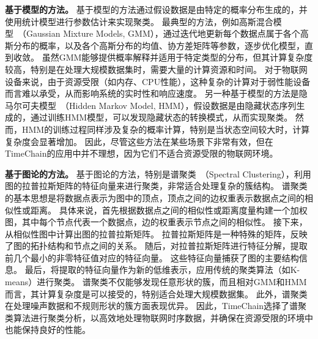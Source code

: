 \textbf{基于模型的方法。}
基于模型的方法通过假设数据是由特定的概率分布生成的，并使用统计模型进行参数估计来实现聚类。
最典型的方法，例如高斯混合模型~\cite{kanungo2002efficient}（Gaussian Mixture Models, GMM），通过迭代地更新每个数据点属于各个高斯分布的概率，以及各个高斯分布的均值、协方差矩阵等参数，逐步优化模型，直到收敛。
虽然GMM能够提供概率解释并适用于特定类型的分布，但其计算复杂度较高，特别是在处理大规模数据集时，需要大量的计算资源和时间。
对于物联网设备来说，由于资源受限（如内存、CPU性能），这种复杂的计算对于弱性能设备而言难以承受，从而影响系统的实时性和响应速度。
另一种基于模型的方法是隐马尔可夫模型~\cite{he2010laplacian}（Hidden Markov Model, HMM），假设数据是由隐藏状态序列生成的，通过训练HMM模型，可以发现隐藏状态的转换模式，从而实现聚类。
然而，HMM的训练过程同样涉及复杂的概率计算，特别是当状态空间较大时，计算复杂度会显著增加。
因此，尽管这些方法在某些场景下非常有效，但在TimeChain的应用中并不理想，因为它们不适合资源受限的物联网环境。

\textbf{基于图论的方法。}
基于图论的方法，特别是谱聚类~\cite{von2007tutorial}（Spectral Clustering），利用图的拉普拉斯矩阵的特征向量来进行聚类，非常适合处理复杂的簇结构。
谱聚类的基本思想是将数据点表示为图中的顶点，顶点之间的边权重表示数据点之间的相似性或距离。
具体来说，首先根据数据点之间的相似性或距离度量构建一个加权图，其中每个节点代表一个数据点，边的权重表示节点之间的相似性。
接下来，从相似性图中计算出图的拉普拉斯矩阵。
拉普拉斯矩阵是一种特殊的矩阵，反映了图的拓扑结构和节点之间的关系。
随后，对拉普拉斯矩阵进行特征分解，提取前几个最小的非零特征值对应的特征向量。
这些特征向量捕获了图的主要结构信息。
最后，将提取的特征向量作为新的低维表示，应用传统的聚类算法（如K-means）进行聚类。
谱聚类不仅能够发现任意形状的簇，而且相对GMM和HMM而言，其计算复杂度是可以接受的，特别适合处理大规模数据集。
此外，谱聚类在处理噪声数据和不规则形状的簇方面表现优异。
因此，TimeChain选择了谱聚类算法进行聚类分析，以高效地处理物联网时序数据，并确保在资源受限的环境中也能保持良好的性能。


